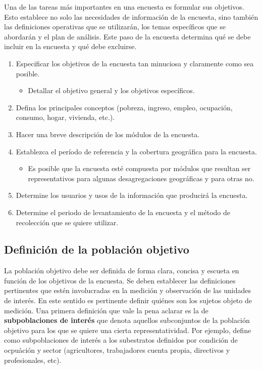 \documentclass[
  10pt,
  spanish,
]{book}
\providecommand{\tightlist}{%
  \setlength{\itemsep}{0pt}\setlength{\parskip}{0pt}}
\begin{document}
Una de las tareas más importantes en una encuesta es formular sus objetivos. Esto establece no solo las necesidades de información de la encuesta, sino también las definiciones operativas que se utilizarán, los temas específicos que se abordarán y el plan de análisis. Este paso de la encuesta determina qué se debe incluir en la encuesta y qué debe excluirse.

\begin{enumerate}
\def\labelenumi{\arabic{enumi}.}
\tightlist
\item
  Especificar los objetivos de la encuesta tan minuciosa y claramente como sea posible.

  \begin{itemize}
  \tightlist
  \item
    Detallar el objetivo general y los objetivos específicos.
  \end{itemize}
\item
  Defina los principales conceptos (pobreza, ingreso, empleo, ocupación, consumo, hogar, vivienda, etc.).
\item
  Hacer una breve descripción de los módulos de la encuesta.
\item
  Establezca el período de referencia y la cobertura geográfica para la encuesta.

  \begin{itemize}
  \tightlist
  \item
    Es posible que la encuesta esté compuesta por módulos que resultan ser representativos para algunas desagregaciones geográficas y para otras no.
  \end{itemize}
\item
  Determine los usuarios y usos de la información que producirá la encuesta.
\item
  Determine el periodo de levantamiento de la encuesta y el método de recolección que se quiere utilizar.
\end{enumerate}

\hypertarget{definiciuxf3n-de-la-poblaciuxf3n-objetivo}{%
\subsection*{Definición de la población objetivo}\label{definiciuxf3n-de-la-poblaciuxf3n-objetivo}}

La población objetivo debe ser definida de forma clara, concisa y escueta en función de los objetivos de la encuesta. Se deben establecer las definiciones pertinentes que estén involucradas en la medición y observación de las unidades de interés. En este sentido es pertinente definir quiénes son los sujetos objeto de medición. Una primera definición que vale la pena aclarar es la de \textbf{subpoblaciones de interés} que denota aquellos subconjuntos de la población objetivo para los que se quiere una cierta representatividad. Por ejemplo, \citet{INE_ES_2002} define como subpoblaciones de interés a los subestratos definidos por condición de ocpuàción y sector (agricultores, trabajadores cuenta propia, directivos y profesionales, etc).
\end{document}
